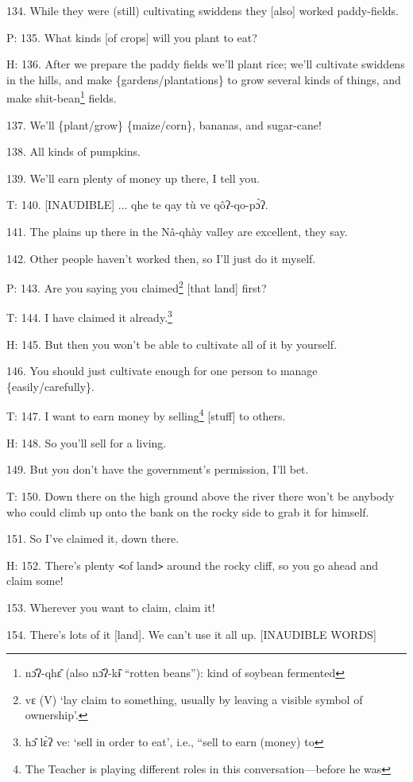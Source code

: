 134. While they were (still) cultivating swiddens they [also] worked paddy-fields.

P: 135. What kinds [of crops] will you plant to eat?

H: 136. After we prepare the paddy fields we'll plant rice; we'll cultivate swiddens
in the hills, and make \{gardens/plantations\} to grow several kinds of things,
and make shit-bean\footnote{nɔ̂ʔ-qhɛ̂ (also nɔ̂ʔ-kɨ̂ ``rotten beans''): kind of soybean fermented} fields.

137. We'll \{plant/grow\} \{maize/corn\}, bananas, and sugar-cane!

138. All kinds of pumpkins.

139. We'll earn plenty of money up there, I tell you.

T: 140. [INAUDIBLE] ... qhe te qay tù ve qôʔ-qo-pɔ̀ʔ.

141. The plains up there in the Nâ-qhày valley are excellent, they say.

142. Other people haven't worked then, so I'll just do it myself.

P: 143. Are you saying you claimed\footnote{vɛ (V) `lay claim to something, usually by leaving a visible symbol of ownership'.} [that land] first?

T: 144. I have claimed it already.\footnote{hɔ̂ lɛ̀ʔ ve: `sell in order to eat', i.e., ``sell to earn (money) to}

H: 145. But then you won't be able to cultivate all of it by yourself.

146. You should just cultivate enough for one person to manage \{easily/carefully\}.

T: 147. I want to earn money by selling\footnote{The Teacher is playing different roles in this conversation---before he was} [stuff] to others.

H: 148. So you'll sell for a living.

149. But you don't have the government's permission, I'll bet.

T: 150. Down there on the high ground above the river there won't be anybody who
could climb up onto the bank on the rocky side to grab it for himself.

151. So I've claimed it, down there.

H: 152. There's plenty \texttt{<}of land\texttt{>} around the rocky cliff, so you
go ahead and claim some!

153. Wherever you want to claim, claim it!

154. There's lots of it [land]. We can't use it all up. [INAUDIBLE WORDS]

